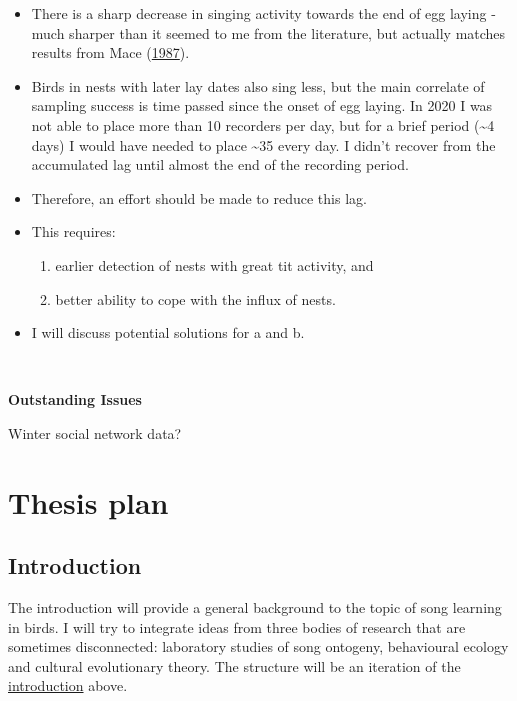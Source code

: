 \documentclass[]{report}
\begin{document}
\begin{itemize}
\item
  There is a sharp decrease in singing activity towards the end of egg
  laying - much sharper than it seemed to me from the literature, but
  actually matches results from Mace
  (\protect\hyperlink{ref-Mace1987}{1987}).
\item
  Birds in nests with later lay dates also sing less, but the main
  correlate of sampling success is time passed since the onset of egg
  laying. In 2020 I was not able to place more than 10 recorders per
  day, but for a brief period (\textasciitilde{}4 days) I would have
  needed to place \textasciitilde{}35 every day. I didn't recover from
  the accumulated lag until almost the end of the recording period.
\item
  Therefore, an effort should be made to reduce this lag.
\item
  This requires:

  \begin{enumerate}
  \def\labelenumi{\alph{enumi})}
  \item
    earlier detection of nests with great tit activity, and
  \item
    better ability to cope with the influx of nests.
  \end{enumerate}
\item
  I will discuss potential solutions for a and b.
\end{itemize}

~ ~

\textbf{Outstanding Issues}

Winter social network data?

\hypertarget{thesis-plan}{%
\chapter{Thesis plan}\label{thesis-plan}}

\hypertarget{introduction-1}{%
\section{Introduction}\label{introduction-1}}

The introduction will provide a general background to the topic of song
learning in birds. I will try to integrate ideas from three bodies of
research that are sometimes disconnected: laboratory studies of song
ontogeny, behavioural ecology and cultural evolutionary theory. The
structure will be an iteration of the
\protect\hyperlink{introduction}{introduction} above.
\end{document}
